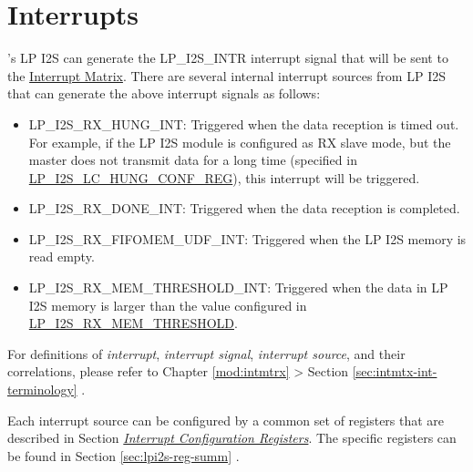 \documentclass[main\_\_EN.tex]{subfiles}
\begin{document}

\section{Interrupts}
\label{sec:lpi2s-intr}

\chipname{}'s LP I2S can generate the LP\_I2S\_INTR interrupt signal that will be sent to the \hyperref[mod:intmtrx]{Interrupt Matrix}. There are several internal interrupt sources from LP I2S that can generate the above interrupt signals as follows:

\begin{itemize}
\item \label{int:LPI2SRXHUNGINT}LP\_I2S\_RX\_HUNG\_INT: Triggered when the data reception is timed out. For example, if the LP I2S module is configured as RX slave mode, but the master does not transmit data for a long time (specified in \hyperref[regdesc:LPI2SLCHUNGCONFREG]{LP\_I2S\_LC\_HUNG\_CONF\_REG}), this interrupt will be triggered.
\item \label{int:LPI2SRXDONEINT}LP\_I2S\_RX\_DONE\_INT: Triggered when the data reception is completed.
\item \label{int:LPI2SRXFIFOMEMUDFINT}LP\_I2S\_RX\_FIFOMEM\_UDF\_INT: Triggered when the LP I2S memory is read empty.
\item \label{int:LPI2SRXMEMTHRESHOLDINT}LP\_I2S\_RX\_MEM\_THRESHOLD\_INT: Triggered when the data in LP I2S memory is larger than the value configured in \hyperref[fielddesc:LPI2SRXMEMTHRESHOLD]{LP\_I2S\_RX\_MEM\_THRESHOLD}.
\end{itemize}

\begin{tiplisting}
    For definitions of \textit{interrupt}, \textit{interrupt signal}, \textit{interrupt source}, and their correlations, please refer to Chapter \ref{mod:intmtrx} \textit{} > Section \ref{sec:intmtx-int-terminology} \textit{}.
\end{tiplisting}

Each interrupt source can be configured by a common set of registers that are described in Section \hyperref[interrupt-config-registers]{\textit{Interrupt Configuration Registers}}. The specific registers can be found in Section \ref{sec:lpi2s-reg-summ} \textit{}.


\end{document}
